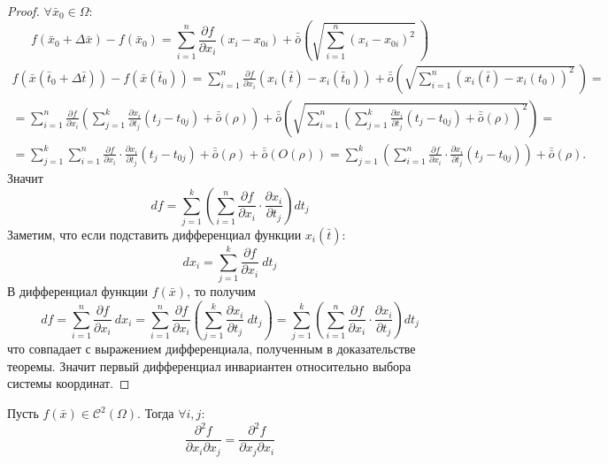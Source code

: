 \begin{proof}
    $\forall \bar{x}_0\in \Omega$:
    \[f(\bar{x}_0+\Delta \bar{x})-f(\bar{x}_0)=\sum\limits_{i=1}^{n}\frac{\partial {f}}{\partial {x_i}}(x_i-x_{0i})+\bar{\bar{o}}{\left(\sqrt{\sum\limits_{i=1}^{n}(x_i-x_{0i})^2}\ \right)}\]
    \begin{multline*}
        f(\bar{x}(\bar{t}_0+\Delta \bar{t}))-f(\bar{x}(\bar{t}_0))=\sum\limits_{i=1}^{n}\frac{\partial {f}}{\partial {x_i}}(x_i(\bar{t})-x_i(\bar{t}_0))+\bar{\bar{o}}{\left(\sqrt{\sum\limits_{i=1}^{n}(x_i(\bar{t})-x_i(t_0))^2}\ \right)}=\\
        =\sum\limits_{i=1}^{n}\frac{\partial {f}}{\partial {x_i}}\left(\sum\limits_{j=1}^{k}\frac{\partial {x_i}}{\partial {t_j}}(t_j-t_{0j})+\bar{\bar{o}}{(\rho)}\right)+\bar{\bar{o}}{\left(\sqrt{\sum\limits_{i=1}^{n}\left(\sum\limits_{j=1}^{k}\frac{\partial {x_i}}{\partial {t_j}}(t_j-t_{0j})+\bar{\bar{o}}{(\rho)}\right)^2}\right)}=\\
        =\sum\limits_{j=1}^{k}\sum\limits_{i=1}^{n}\frac{\partial {f}}{\partial {x_i}}\cdot \frac{\partial {x_i}}{\partial {t_j}}(t_j-t_{0j})+\bar{\bar{o}}{(\rho)}+\bar{\bar{o}}{(O(\rho))}=\sum\limits_{j=1}^{k}\left(\sum\limits_{i=1}^{n}\frac{\partial {f}}{\partial {x_i}}\cdot \frac{\partial {x_i}}{\partial {t_j}}(t_j-t_{0j})\right)+\bar{\bar{o}}{(\rho)}.
    \end{multline*}
    Значит
    \[df=\sum\limits_{j=1}^{k}\left(\sum\limits_{i=1}^{n}\frac{\partial {f}}{\partial {x_i}}\cdot \frac{\partial {x_i}}{\partial {t_j}}\right) dt_j\]
    Заметим, что если подставить дифференциал функции $x_i(\bar{t})$:
    \[dx_i=\sum\limits_{j=1}^{k}\frac{\partial {f}}{\partial {x_i}}\ dt_j\]
    В дифференциал функции $f(\bar{x})$, то получим
    \[df = \sum\limits_{i=1}^{n}\frac{\partial {f}}{\partial {x_i}}\ dx_i=\sum\limits_{i=1}^{n}\frac{\partial {f}}{\partial {x_i}}\left(\sum\limits_{j=1}^{k}\frac{\partial {x_i}}{\partial {t_j}}\ dt_j\right)=\sum\limits_{j=1}^{k}\left(\sum\limits_{i=1}^{n}\frac{\partial {f}}{\partial {x_i}}\cdot \frac{\partial {x_i}}{\partial {t_j}}\right) dt_j\]
    что совпадает с выражением дифференциала, полученным в доказательстве теоремы. Значит первый дифференциал инвариантен относительно выбора системы координат. 
\end{proof} 
\begin{theorem}
    Пусть $f(\bar{x})\in \mathcal{C}^2(\Omega)$. Тогда $\forall i,j:$
    \[\frac{\partial^2 {f}}{\partial {x_i}\partial{x_j}}=\frac{\partial^2 {f}}{\partial {x_j}\partial{x_i}}\]
\end{theorem} 
